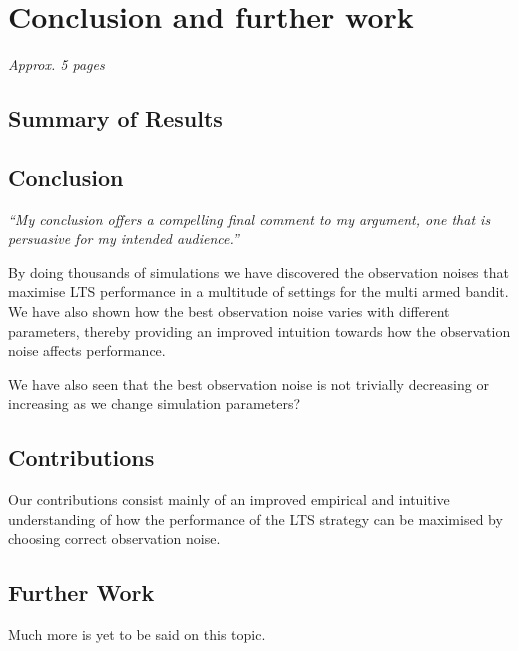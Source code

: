 \chapter{Conclusion and further work}
\label{ch:conclusion}
\textit{Approx. 5 pages}

\section{Summary of Results}

\section{Conclusion}
\emph{“My conclusion offers a compelling final comment to my argument, one that is persuasive for my intended audience.”}

By doing thousands of simulations we have discovered the observation noises that maximise LTS performance in a multitude of settings for the multi armed bandit.
We have also shown how the best observation noise varies with different parameters, thereby providing an improved intuition towards how the observation noise affects performance.

We have also seen that the best observation noise is not trivially decreasing or increasing as we change simulation parameters?

\section{Contributions}
Our contributions consist mainly of an improved empirical and intuitive understanding of how the performance of the LTS strategy can be maximised by choosing correct observation noise.


\section{Further Work}
Much more is yet to be said on this topic.

